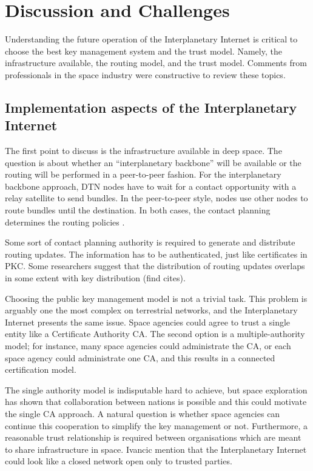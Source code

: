 
\section{Discussion and Challenges}
\label{sec:evaluation}

Understanding the future operation of the Interplanetary Internet is critical to choose the best key management system and the trust model. Namely, the infrastructure available, the routing model, and the trust model. Comments from professionals in the space industry were constructive to review these topics.


\subsection{Implementation aspects of the Interplanetary Internet}

The first point to discuss is the infrastructure available in deep space. The question is about whether an ``interplanetary backbone'' will be available or the routing will be performed in a peer-to-peer fashion. For the interplanetary backbone approach, DTN nodes have to wait for a contact opportunity with a relay satellite to send bundles. In the peer-to-peer style, nodes use other nodes to route bundles until the destination. In both cases, the contact planning determines the routing policies \cite{ietf-dtn-bpsec-07,cerf2007delay}. 

Some sort of contact planning authority is required to generate and distribute routing updates. The information has to be authenticated, just like certificates in PKC. Some researchers suggest that the distribution of routing updates overlaps in some extent with key distribution (find cites). 

Choosing the public key management model is not a trivial task. This problem is arguably one the most complex on terrestrial networks, and the Interplanetary Internet presents the same issue. Space agencies could agree to trust a single entity like a Certificate Authority CA.  The second option is a multiple-authority model; for instance, many space agencies could administrate the CA, or each space agency could administrate one CA, and this results in a connected certification model.

The single authority model is indisputable hard to achieve, but space exploration has shown that collaboration between nations is possible and this could motivate the single CA approach. A natural question is whether space agencies can continue this cooperation to simplify the key management or not. Furthermore, a reasonable trust relationship is required between organisations which are meant to share infrastructure in space. Ivancic \cite{ivancic2009security} mention that the Interplanetary Internet could look like a closed network open only to trusted parties. 

